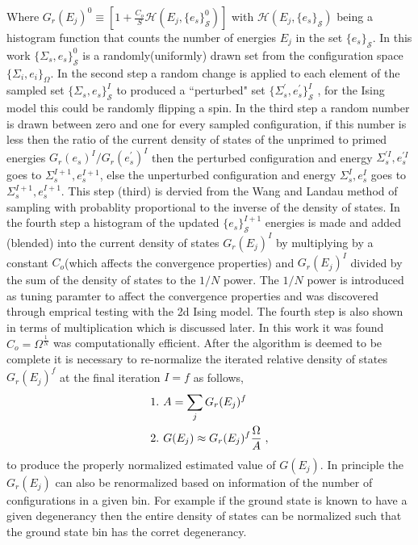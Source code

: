 \documentclass[aps,pre,reprint,superscriptaddress,showkeys]{revtex4-1}
\begin{document}
Where  $G_{r}(E_j)^0 \equiv [1 +  \frac{C_o}{S}\mathcal{H}(E_j,\{e_s\}_{\mathcal{S}}^0)]$ with $\mathcal{H}(E_j,\{e_s\}_{\mathcal{S}})$ being a histogram function that counts the number of energies $E_j$ in the set $\{e_s\}_{\mathcal{S}}$. In this work $\{\Sigma_{s},e_s\}_{\mathcal{S}}^0$  is a randomly(uniformly) drawn set from the configuration space $\{ \Sigma_i, e_i \}_\Omega $. In the second step  a random change is applied to each element of the sampled set $\{\Sigma_{s},e_s\}_{\mathcal{S}}^I$ to produced a ``perturbed" set $ \{\Sigma_{s}^{'},e_s^{'}\}_{\mathcal{S}}^I$ , for the Ising model this could be randomly flipping a spin.  In the third step a random number is drawn between zero and one for every sampled configuration, if this number is less then the ratio of the current density of states of the unprimed to primed energies $G_{r}(e_s)^{I}/G_{r}(e_s^{'})^{I}$ then the perturbed configuration and energy  $\Sigma_{s}^{'I},e_s^{'I}$  goes to $\Sigma_{s}^{I+1},e_s^{I+1}$,  else the unperturbed configuration and energy $\Sigma_{s}^{I},e_s^I$  goes to $\Sigma_{s}^{I+1},e_s^{I+1}$. This step (third) is dervied from the Wang and Landau method of sampling with probablity proportional to the inverse of the density of states.  In the fourth step a histogram of the updated $\{ e_s \}^{I+1}_{\mathcal{S}}$ energies is made and added (blended) into the current density of states $G_{r}(E_j)^I$   by multiplying  by a constant $C_{o}$(which affects the convergence properties) and   $G_{r}(E_j)^{I}$ divided by the sum of the density of states to the $1/N$ power. The $1/N$ power is introduced as tuning paramter to affect the convergence properties and was discovered through emprical testing with the 2d Ising model.  The fourth step is also shown in terms of multiplication which is discussed later. In this work it was found  $C_{o}=\Omega^{\frac{1}{N}}$ was computationally efficient. After the algorithm is deemed to be complete it is necessary to re-normalize the iterated relative density of states $G_{r}(E_j)^f$ at the final iteration $I=f$ as follows, 
\begin{equation}
\begin{split}
&1. \hspace{0.125cm} A = \sum_jG_{r}(E_j)^f\\
&2. \hspace{0.125cm} G(E_j)\approx G_{r}(E_j)^f \frac{\Omega}{A} \;,
\end{split}
\label{renormalize}
\end{equation}
to produce the properly normalized estimated value of $G(E_j)$. In principle the $G_{r}(E_j)$ can also be renormalized based on information of the number of configurations in a given bin. For example if the ground state is known to have a given degenerancy then the entire density of states can be normalized such that the ground state bin has the corret degenerancy. 
\end{document}
